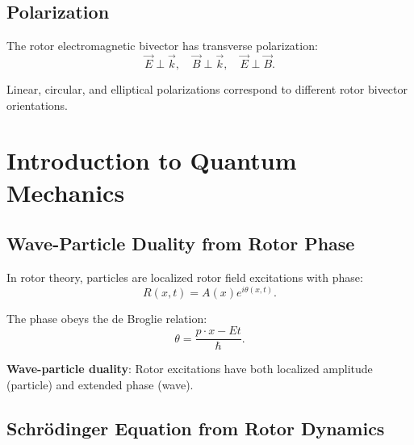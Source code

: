 \documentclass[12pt,a4paper]{article}
\theoremstyle{definition}
\theoremstyle{remark}
\begin{document}
\subsection{Polarization}

The rotor electromagnetic bivector has transverse polarization:
\begin{equation}
\vec{E} \perp \vec{k}, \quad \vec{B} \perp \vec{k}, \quad \vec{E} \perp \vec{B}.
\end{equation}

Linear, circular, and elliptical polarizations correspond to different rotor bivector orientations.

\section{Introduction to Quantum Mechanics}

\subsection{Wave-Particle Duality from Rotor Phase}

In rotor theory, particles are localized rotor field excitations with phase:
\begin{equation}
R(x,t) = A(x) e^{i\theta(x,t)}.
\end{equation}

The phase obeys the de Broglie relation:
\begin{equation}
\theta = \frac{p \cdot x - Et}{\hbar}.
\end{equation}

\textbf{Wave-particle duality}: Rotor excitations have both localized amplitude (particle) and extended phase (wave).

\subsection{Schrödinger Equation from Rotor Dynamics}
\end{document}
